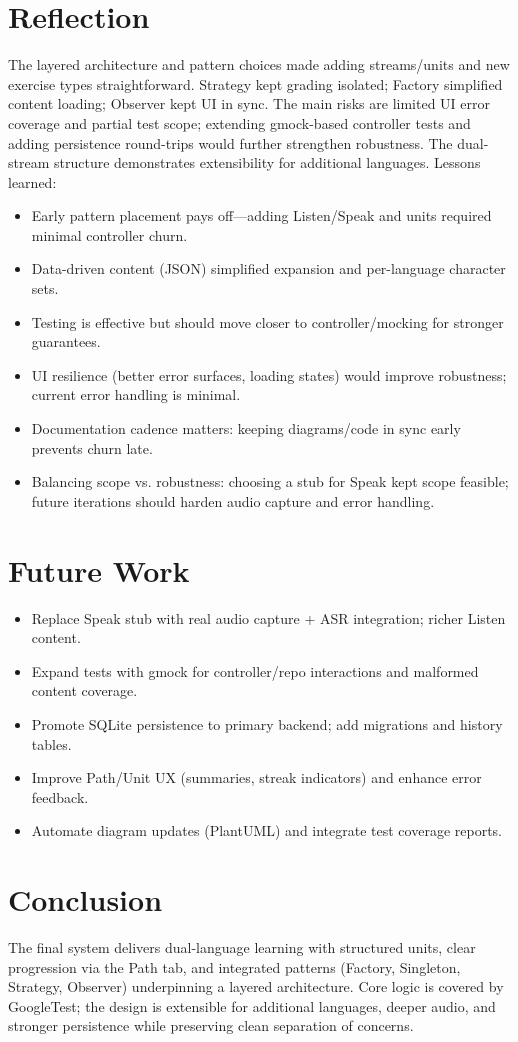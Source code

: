 \documentclass{article}
\begin{document}
\section{Reflection}
The layered architecture and pattern choices made adding streams/units and new exercise types straightforward. Strategy kept grading isolated; Factory simplified content loading; Observer kept UI in sync. The main risks are limited UI error coverage and partial test scope; extending gmock-based controller tests and adding persistence round-trips would further strengthen robustness. The dual-stream structure demonstrates extensibility for additional languages. Lessons learned:
\begin{itemize}
  \item Early pattern placement pays off—adding Listen/Speak and units required minimal controller churn.
  \item Data-driven content (JSON) simplified expansion and per-language character sets.
  \item Testing is effective but should move closer to controller/mocking for stronger guarantees.
  \item UI resilience (better error surfaces, loading states) would improve robustness; current error handling is minimal.
  \item Documentation cadence matters: keeping diagrams/code in sync early prevents churn late.
  \item Balancing scope vs. robustness: choosing a stub for Speak kept scope feasible; future iterations should harden audio capture and error handling.
\end{itemize}

\section{Future Work}
\begin{itemize}
  \item Replace Speak stub with real audio capture + ASR integration; richer Listen content.
  \item Expand tests with gmock for controller/repo interactions and malformed content coverage.
  \item Promote SQLite persistence to primary backend; add migrations and history tables.
  \item Improve Path/Unit UX (summaries, streak indicators) and enhance error feedback.
  \item Automate diagram updates (PlantUML) and integrate test coverage reports.
\end{itemize}

\section{Conclusion}
The final system delivers dual-language learning with structured units, clear progression via the Path tab, and integrated patterns (Factory, Singleton, Strategy, Observer) underpinning a layered architecture. Core logic is covered by GoogleTest; the design is extensible for additional languages, deeper audio, and stronger persistence while preserving clean separation of concerns.
\end{document}
